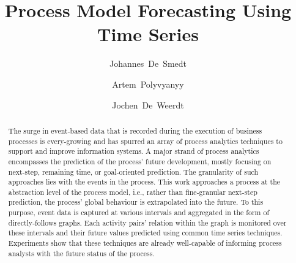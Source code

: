 \documentclass{svproc}
\begin{document}
\mainmatter      
%
\title{Process Model Forecasting Using Time Series}
%
%
\author{Johannes~De~Smedt \and Artem~Polyvyanyy \and Jochen~De~Weerdt}
%
%
\maketitle              

\begin{abstract}
The surge in event-based data that is recorded during the execution of business processes is every-growing and has spurred an array of process analytics techniques to support and improve information systems.
A major strand of process analytics encompasses the prediction of the process' future development, mostly focusing on next-step, remaining time, or goal-oriented prediction.
The granularity of such approaches lies with the events in the process.
This work approaches a process at the abstraction level of the process model, i.e., rather than fine-granular next-step prediction, the process' global behaviour is extrapolated into the future.
To this purpose, event data is captured at various intervals and aggregated in the form of directly-follows graphs.
Each activity pairs' relation within the graph is monitored over these intervals and their future values predicted using common time series techniques.
Experiments show that these techniques are already well-capable of informing process analysts with the future status of the process.
\end{abstract}
%




%
%



\end{document}

